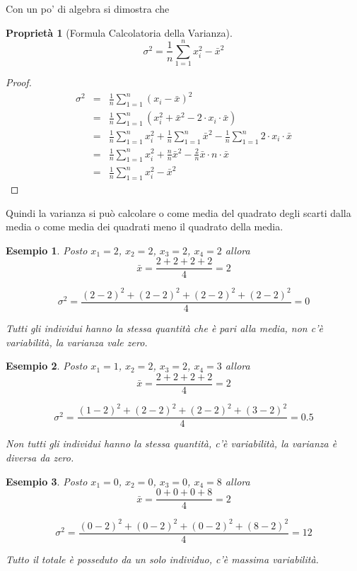 \documentclass[
  11pt,
]{book}
\theoremstyle{mytheoremstyle}
\newtheorem{proposition}{Proprietà}[section]
\theoremstyle{mydefstyle}
\newtheorem{example}{{Esempio}}[section]
\begin{document}
Con un po' di algebra si dimostra che

\begin{info}

\begin{proposition}[Formula Calcolatoria della Varianza]
\[
\sigma^2=\frac 1 n \sum_{1=1}^n x_i^2 -\bar x^2
\]
\end{proposition}

\end{info}

\begin{proof}
\begin{eqnarray*}
   \sigma^2 &=&  \frac 1 n \sum_{1=1}^n(x_i-\bar x)^2\\
   &=& \frac 1n\sum_{1=1}^n(x_i^2+\bar x^2-2\cdot x_i\cdot \bar x)\\
   &=& \frac 1n\sum_{1=1}^n x_i^2+\frac 1n\sum_{1=1}^n \bar x^2-\frac 1n\sum_{1=1}^n2\cdot x_i\cdot \bar x\\
   &=& \frac 1n\sum_{1=1}^n x_i^2+\frac nn \bar x^2-\frac 2n\bar x \cdot n\cdot \bar x\\
   &=& \frac 1 n \sum_{1=1}^n x_i^2 -\bar x^2
\end{eqnarray*}
\end{proof}

Quindi la varianza si può calcolare o come media del quadrato degli scarti dalla media o come media dei quadrati meno il quadrato della media.

\begin{example}
Posto \(x_1=2\), \(x_2=2\), \(x_3=2\), \(x_4=2\) allora
\[\bar x =\frac{2+2+2+2}{4}=2\]

\[
\sigma^2=\frac {(2-2)^2+(2-2)^2+(2-2)^2+(2-2)^2}{4}=0
\]

Tutti gli individui hanno la stessa quantità che è pari alla media, non c'è variabilità, la varianza vale zero.
\end{example}

\begin{example}
Posto \(x_1=1\), \(x_2=2\), \(x_3=2\), \(x_4=3\) allora
\[\bar x =\frac{2+2+2+2}{4}=2\]

\[
\sigma^2=\frac {(1-2)^2+(2-2)^2+(2-2)^2+(3-2)^2}{4}=0.5
\]

Non tutti gli individui hanno la stessa quantità, c'è variabilità, la varianza è diversa da zero.
\end{example}

\begin{example}
Posto \(x_1=0\), \(x_2=0\), \(x_3=0\), \(x_4=8\) allora
\[\bar x =\frac{0+0+0+8}{4}=2\]

\[
\sigma^2=\frac {(0-2)^2+(0-2)^2+(0-2)^2+(8-2)^2}{4}=12
\]

Tutto il totale è posseduto da un solo individuo, c'è massima variabilità.
\end{example}
\end{document}
